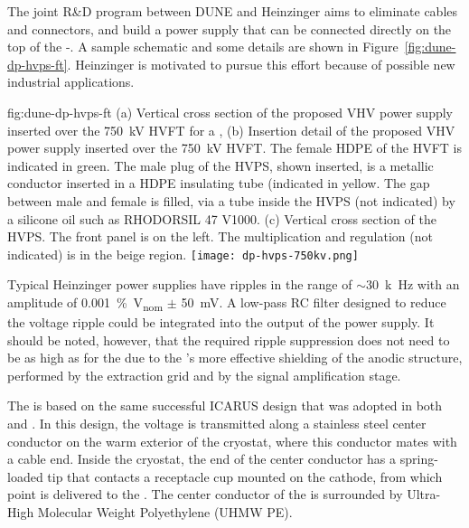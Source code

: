 The joint R\&D program between DUNE and Heinzinger aims to eliminate cables and connectors, and build a power supply that can be connected directly on the top of the -\fdth.  A sample schematic and some details are shown in Figure~\ref{fig:dune-dp-hvps-ft}. 
Heinzinger is motivated to pursue this effort because of possible new industrial applications.

\begin{dunefigure}
{fig:dune-dp-hvps-ft}
{(a) Vertical cross section of the proposed VHV power supply inserted over the \SI{750}{kV} HVFT for a \dpmod{}, 
(b) Insertion detail of the proposed VHV power supply inserted over the \SI{750}{kV} HVFT. The female HDPE of the HVFT is indicated in green. The male plug of the HVPS, shown inserted, is a metallic conductor inserted in a HDPE insulating tube (indicated in yellow. The gap between male and female is filled, via a tube inside the HVPS (not indicated) by a silicone oil such as RHODORSIL 47 V1000. (c) Vertical cross section of the HVPS. The front panel is on the left. The  multiplication and regulation (not indicated) is in the beige region.}
\texttt{[image: dp-hvps-750kv.png]}
\end{dunefigure}


Typical Heinzinger power supplies have ripples in the range of $\sim$\SI{30}{k\hertz} with an amplitude of \SI{0.001}{\%V_{nom}} $\pm$ \SI{50}{mV}. A low-pass RC filter designed to reduce the voltage ripple could be integrated into the output of the power supply.  It should be noted, however, that the required ripple suppression does not need to be as high as for the  due to the 's more effective shielding of the anodic structure, performed by the extraction grid and by the  signal amplification stage. 


The  \fdth is based on the same successful ICARUS design that was adopted in both  and .  In this design, the voltage is transmitted along a stainless steel center conductor on the warm exterior of the cryostat, where this conductor mates with a cable end.  Inside the cryostat, the end of the center conductor has a spring-loaded tip that  contacts a receptacle cup mounted on the cathode, from which point  is delivered to the .  The center conductor of the \fdth is surrounded by Ultra-High Molecular Weight Polyethylene (UHMW PE).  


